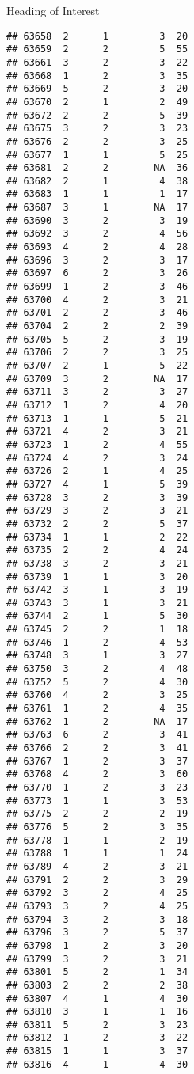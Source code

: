 \documentclass[
  ignorenonframetext,
]{beamer}
\begin{document}
\begin{frame}[fragile]{Heading of Interest}
\begin{verbatim}
## 63658  2      1         3  20
## 63659  2      2         5  55
## 63661  3      2         3  22
## 63668  1      2         3  35
## 63669  5      2         3  20
## 63670  2      1         2  49
## 63672  2      2         5  39
## 63675  3      2         3  23
## 63676  2      2         3  25
## 63677  1      1         5  25
## 63681  2      2        NA  36
## 63682  2      1         4  38
## 63683  1      1         1  17
## 63687  3      1        NA  17
## 63690  3      2         3  19
## 63692  3      2         4  56
## 63693  4      2         4  28
## 63696  3      2         3  17
## 63697  6      2         3  26
## 63699  1      2         3  46
## 63700  4      2         3  21
## 63701  2      2         3  46
## 63704  2      2         2  39
## 63705  5      2         3  19
## 63706  2      2         3  25
## 63707  2      1         5  22
## 63709  3      2        NA  17
## 63711  3      2         3  27
## 63712  1      2         4  20
## 63713  1      1         5  21
## 63721  4      2         3  21
## 63723  1      2         4  55
## 63724  4      2         3  24
## 63726  2      1         4  25
## 63727  4      1         5  39
## 63728  3      2         3  39
## 63729  3      2         3  21
## 63732  2      2         5  37
## 63734  1      1         2  22
## 63735  2      2         4  24
## 63738  3      2         3  21
## 63739  1      1         3  20
## 63742  3      1         3  19
## 63743  3      1         3  21
## 63744  2      1         5  30
## 63745  2      2         1  18
## 63746  1      2         4  53
## 63748  3      1         3  27
## 63750  3      2         4  48
## 63752  5      2         4  30
## 63760  4      2         3  25
## 63761  1      2         4  35
## 63762  1      2        NA  17
## 63763  6      2         3  41
## 63766  2      2         3  41
## 63767  1      2         3  37
## 63768  4      2         3  60
## 63770  1      2         3  23
## 63773  1      1         3  53
## 63775  2      2         2  19
## 63776  5      2         3  35
## 63778  1      1         2  19
## 63788  1      1         1  24
## 63789  4      2         3  21
## 63791  2      2         3  29
## 63792  3      2         4  25
## 63793  3      2         4  25
## 63794  3      2         3  18
## 63796  3      2         5  37
## 63798  1      2         3  20
## 63799  3      2         3  21
## 63801  5      2         1  34
## 63803  2      2         2  38
## 63807  4      1         4  30
## 63810  3      1         1  16
## 63811  5      2         3  23
## 63812  1      2         3  22
## 63815  1      1         3  37
## 63816  4      1         4  30

\end{verbatim}
\end{frame}
\end{document}
